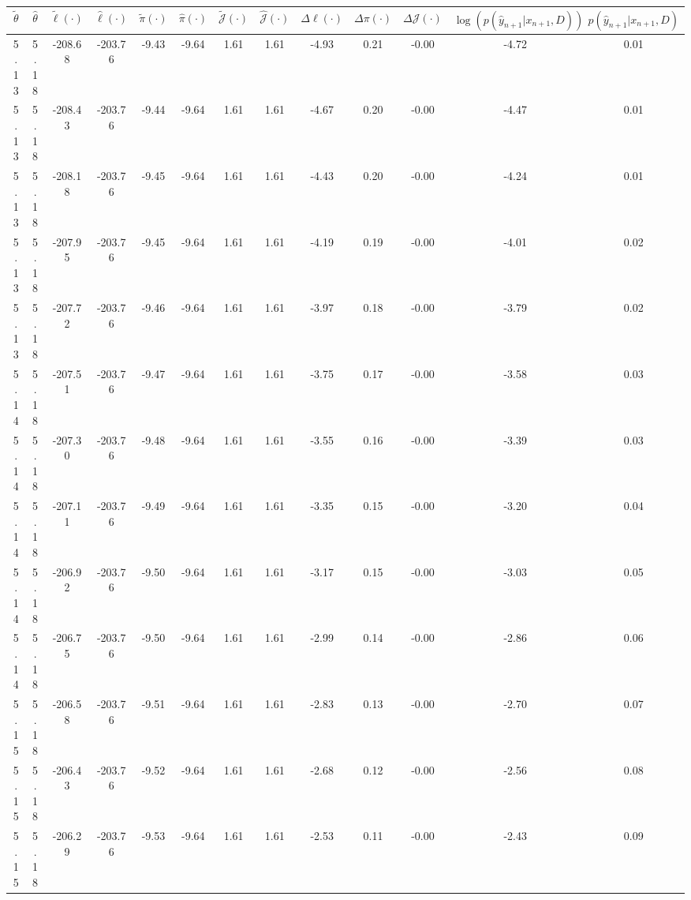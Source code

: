 \begin{table}[htbp]
        \centering
        \tiny
        \begin{adjustbox}{angle=90}
            \begin{tabular}{|c|c|c|c|c|c|c|c|c|c|c|c|c|}
                \hline
                 $\tilde{\theta}$ & $\hat{\theta}$ & $\tilde{\ell}(\cdot)$ & $\hat{\ell}(\cdot)$ & $\tilde{\pi}(\cdot)$ & $\hat{\pi}(\cdot)$ & $\tilde{\mathcal{J}}(\cdot)$ & $\hat{\mathcal{J}}(\cdot)$ & $\Delta \ell(\cdot)$ & $\Delta \pi(\cdot)$ & $\Delta \mathcal{J}(\cdot)$ & $\log(p(\hat{y}_{n+1}|x_{n+1}, D))$ & $p(\hat{y}_{n+1}|x_{n+1}, D)$ \\
                \hline
                 5.13 & 5.18 & -208.68 & -203.76 & -9.43 & -9.64 & 1.61 & 1.61 & -4.93 & 0.21 & -0.00 & -4.72 & 0.01\\ \hline
 5.13 & 5.18 & -208.43 & -203.76 & -9.44 & -9.64 & 1.61 & 1.61 & -4.67 & 0.20 & -0.00 & -4.47 & 0.01\\ \hline
 5.13 & 5.18 & -208.18 & -203.76 & -9.45 & -9.64 & 1.61 & 1.61 & -4.43 & 0.20 & -0.00 & -4.24 & 0.01\\ \hline
 5.13 & 5.18 & -207.95 & -203.76 & -9.45 & -9.64 & 1.61 & 1.61 & -4.19 & 0.19 & -0.00 & -4.01 & 0.02\\ \hline
 5.13 & 5.18 & -207.72 & -203.76 & -9.46 & -9.64 & 1.61 & 1.61 & -3.97 & 0.18 & -0.00 & -3.79 & 0.02\\ \hline
 5.14 & 5.18 & -207.51 & -203.76 & -9.47 & -9.64 & 1.61 & 1.61 & -3.75 & 0.17 & -0.00 & -3.58 & 0.03\\ \hline
 5.14 & 5.18 & -207.30 & -203.76 & -9.48 & -9.64 & 1.61 & 1.61 & -3.55 & 0.16 & -0.00 & -3.39 & 0.03\\ \hline
 5.14 & 5.18 & -207.11 & -203.76 & -9.49 & -9.64 & 1.61 & 1.61 & -3.35 & 0.15 & -0.00 & -3.20 & 0.04\\ \hline
 5.14 & 5.18 & -206.92 & -203.76 & -9.50 & -9.64 & 1.61 & 1.61 & -3.17 & 0.15 & -0.00 & -3.03 & 0.05\\ \hline
 5.14 & 5.18 & -206.75 & -203.76 & -9.50 & -9.64 & 1.61 & 1.61 & -2.99 & 0.14 & -0.00 & -2.86 & 0.06\\ \hline
 5.15 & 5.18 & -206.58 & -203.76 & -9.51 & -9.64 & 1.61 & 1.61 & -2.83 & 0.13 & -0.00 & -2.70 & 0.07\\ \hline
 5.15 & 5.18 & -206.43 & -203.76 & -9.52 & -9.64 & 1.61 & 1.61 & -2.68 & 0.12 & -0.00 & -2.56 & 0.08\\ \hline
 5.15 & 5.18 & -206.29 & -203.76 & -9.53 & -9.64 & 1.61 & 1.61 & -2.53 & 0.11 & -0.00 & -2.43 & 0.09\\ \hline

\end{tabular}
\end{adjustbox}
\end{table}
